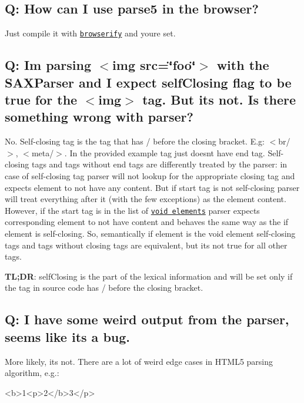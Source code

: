 \subsection*{Q\+: How can I use parse5 in the browser?}

Just compile it with \href{http://browserify.org/}{\tt browserify} and you\textquotesingle{}re set.

\subsection*{Q\+: I\textquotesingle{}m parsing {\ttfamily $<$img src=\char`\"{}foo\char`\"{}$>$} with the {\ttfamily S\+A\+X\+Parser} and I expect {\ttfamily self\+Closing} flag to be {\ttfamily true} for the {\ttfamily $<$img$>$} tag. But it\textquotesingle{}s not. Is there something wrong with parser?}

No. Self-\/closing tag is the tag that has {\ttfamily /} before the closing bracket. E.\+g\+: {\ttfamily $<$br/$>$}, {\ttfamily $<$meta/$>$}. In the provided example tag just doesn\textquotesingle{}t have end tag. Self-\/closing tags and tags without end tags are differently treated by the parser\+: in case of self-\/closing tag parser will not lookup for the appropriate closing tag and expects element to not have any content. But if start tag is not self-\/closing parser will treat everything after it (with the few exceptions) as the element content. However, if the start tag is in the list of \href{https://html.spec.whatwg.org/multipage/syntax.html#void-elements}{\tt void elements} parser expects corresponding element to not have content and behaves the same way as the if element is self-\/closing. So, semantically if element is the void element self-\/closing tags and tags without closing tags are equivalent, but it\textquotesingle{}s not true for all other tags.

{\bfseries TL;DR}\+: {\ttfamily self\+Closing} is the part of the lexical information and will be set only if the tag in source code has {\ttfamily /} before the closing bracket.

\subsection*{Q\+: I have some weird output from the parser, seems like it\textquotesingle{}s a bug.}

More likely, it\textquotesingle{}s not. There are a lot of weird edge cases in H\+T\+M\+L5 parsing algorithm, e.\+g.\+: 
\begin{DoxyCode}
<b>1<p>2</b>3</p>
\end{DoxyCode}


